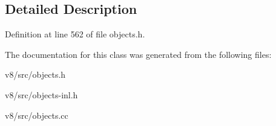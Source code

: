 \subsection{Detailed Description}


Definition at line 562 of file objects.\+h.



The documentation for this class was generated from the following files\+:\begin{DoxyCompactItemize}
\item 
v8/src/objects.\+h\item 
v8/src/objects-\/inl.\+h\item 
v8/src/objects.\+cc\end{DoxyCompactItemize}
